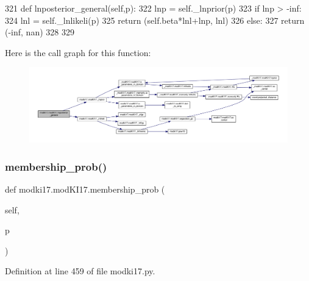 \begin{DoxyCode}
321     \textcolor{keyword}{def }lnposterior\_general(self,p):
322         lnp = self.\_lnprior(p)
323         \textcolor{keywordflow}{if} lnp > -inf:
324             lnl = self.\_lnlikeli(p) 
325             \textcolor{keywordflow}{return} (self.beta*lnl+lnp, lnl)
326         \textcolor{keywordflow}{else}:
327             \textcolor{keywordflow}{return} (-inf, nan)
328     
329 
\end{DoxyCode}
Here is the call graph for this function\+:\nopagebreak
\begin{figure}[H]
\begin{center}
\leavevmode
\includegraphics[width=350pt]{df/da3/classmodki17_1_1modKI17_ae26b505fa65c5f8b3c589a20f849879a_cgraph}
\end{center}
\end{figure}
\mbox{\label{classmodki17_1_1modKI17_acfc9325282029b80be3c61c03d64c5cd}} 
\subsubsection{\texorpdfstring{membership\+\_\+prob()}{membership\_prob()}}
{\footnotesize\ttfamily def modki17.\+mod\+K\+I17.\+membership\+\_\+prob (\begin{DoxyParamCaption}\item[{}]{self,  }\item[{}]{p }\end{DoxyParamCaption})}



Definition at line 459 of file modki17.\+py.


